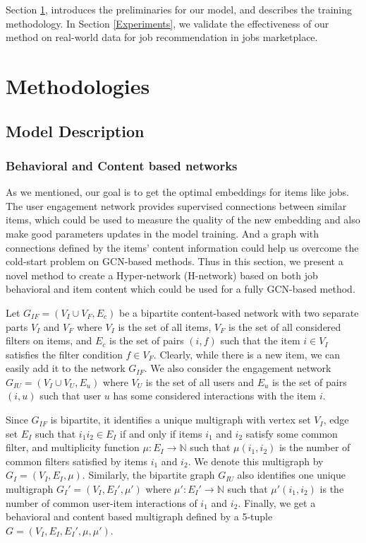 \documentclass[manuscript,screen,review]{acmart}
\begin{document}
Section \ref{Methodologies}, introduces the preliminaries for our model, and describes the training methodology. In Section \ref{Experiments}, we validate the effectiveness of our method on real-world data for job recommendation in jobs marketplace.

\section{Methodologies} \label{Methodologies}

\subsection{Model Description}
\subsubsection{Behavioral and Content based networks}
As we mentioned, our goal is to get the optimal embeddings for items like jobs. The user engagement network provides supervised connections between similar items, which could be used to measure the quality of the new embedding and also make good parameters updates in the model training. And a graph with connections  defined by the items' content information could help us overcome the cold-start problem on GCN-based methods. Thus in this section, we present a novel method to create a Hyper-network (H-network) based on both job behavioral and item content which could be used for a fully GCN-based method. 

Let $G_{IF}=(V_I\cup V_F,E_c)$ be a bipartite content-based network with two separate parts $V_I$ and $V_F$ where $V_I$ is the set of all items, $V_F$ is the set of all considered filters on items, and $E_c$ is the set of pairs $(i,f)$ such that the item $i\in V_I$ satisfies the filter condition $f\in V_F$. Clearly, while there is a new item, we can easily add it to the network $G_{IF}$. We also consider the engagement network $G_{IU}=(V_I\cup V_U,E_u)$ where $V_U$ is the set of all users and $E_u$ is the set of pairs $(i,u)$ such that user $u$ has some considered interactions with the item $i$. 


Since $G_{IF}$ is bipartite, 
it identifies a unique multigraph with vertex set $V_I$, edge set $E_I$ such that $i_1i_2\in E_I$ if and only if items $i_1$ and $i_2$ satisfy some common filter, and multiplicity function $\mu: E_I\to \mathbb{N}$ such that $\mu(i_1,i_2)$ is the number of common filters satisfied by items $i_1$ and $i_2$. We denote this multigraph by $G_I=(V_I,E_I,\mu)$. Similarly, the bipartite graph $G_{IU}$ also identifies one unique multigraph $G_I'=(V_I,E_I',\mu')$ where $\mu': E_I'\to\mathbb{N}$ such that $\mu'(i_1,i_2)$ is the number of common user-item interactions of $i_1$ and $i_2$. Finally, we get a behavioral and content based multigraph defined by a 5-tuple $G=(V_I,E_I,E_I',\mu,\mu')$.
\end{document}
